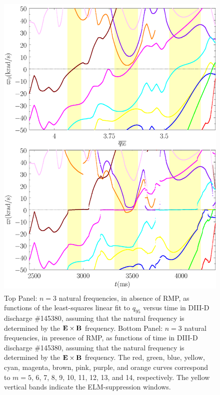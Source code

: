 \documentclass[12pt,prb,aps]{revtex4-1}
\begin{document}
\begin{figure}
\includegraphics[height=6in]{fig4.pdf}
\caption{Top Panel: $n=3$ natural frequencies, in absence of RMP, as functions of the least-squares linear fit to $q_{95}$ versus time
in   DIII-D discharge \#145380, assuming that the natural frequency is determined by the ${\bf E}\times {\bf B}$
frequency.
Bottom Panel:  $n=3$ natural frequencies, in presence of RMP, as functions of time
in   DIII-D discharge \#145380, assuming that the natural frequency is determined by the ${\bf E}\times {\bf B}$
frequency. The red, green, blue, yellow, cyan, magenta, brown, pink,
purple, and orange  curves correspond to $m=5$, 6, 7, 8, 9, 10, 11, 12, 13, and 14, respectively. The yellow vertical bands indicate the ELM-suppression windows.} \label{fig4}
\end{figure}
\end{document}
